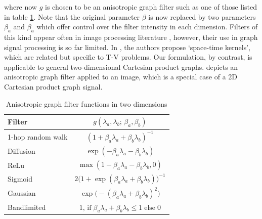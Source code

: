 where now $g$ is chosen to be an anisotropic graph filter such as one of those listed in table \ref{tab:anis_filters_2d}. Note that the original parameter $\beta$ is now replaced by two parameters $\beta_a$ and $\beta_a$ which offer control over the filter intensity in each dimension. Filters of this kind appear often in image processing literature \citep{Aubert2006}, however, their use in graph signal processing is so far limited. In \cite{Romero2017}, the authors propose `space-time kernels', which are related but specific to T-V problems. Our formulation, by contrast, is applicable to general two-dimensional Cartesian product graphs.   depicts an anisotropic graph filter applied to an image, which is a special case of a 2D Cartesian product graph signal.  


\begin{table}[t]
    \vspace*{1cm}
    \def\arraystretch{1.8}
    \begin{center}
        \begin{tabular}{lc}
        \toprule
        \textbf{Filter}   & $g(\lambda_a, \lambda_b; \,\beta_a, \beta_b)$  \\
        \midrule
        1-hop random walk & $(1 + \beta_a \lambda_a + \beta_b \lambda_b)^{-1}$\\
        Diffusion         & $\exp(-\beta_a \lambda_a - \beta_b \lambda_b)$\\
        ReLu              & $\max (1 - \beta_a \lambda_a - \beta_b \lambda_b, 0)$ \\
        Sigmoid           & $2 \big( 1 + \exp(\beta_a \lambda_a + \beta_b \lambda_b)\big)^{-1}$\\
        Gaussian          & $\exp \big(-(\beta_a \lambda_a + \beta_b \lambda_b)^2\big)$\\
        Bandlimited       & $1, \,\text{if} \; \beta_a \lambda_a + \beta_b \lambda_b\leq 1 \; \text{else} \; 0$ \\
        \bottomrule
        \end{tabular}
    \end{center}
    \caption{Anisotropic graph filter functions in two dimensions}
    \label{tab:anis_filters_2d}
    \vspace*{1cm}
\end{table}


